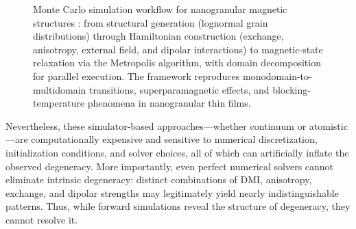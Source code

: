 \documentclass[letterpaper, 12, one column]{article}
\begin{document}
\begin{figure}[!t]
\centering
{}
    \caption{Monte Carlo simulation workflow for nanogranular magnetic structures \cite{AgudeloGiraldo2018}: from structural generation (lognormal grain distributions) through Hamiltonian construction (exchange, anisotropy, external field, and dipolar interactions) to magnetic-state relaxation via the Metropolis algorithm, with domain decomposition for parallel execution. The framework reproduces monodomain-to-multidomain transitions, superparamagnetic effects, and blocking-temperature phenomena in nanogranular thin films.}
    \label{fig:monte_carlo_flow}
\end{figure}

Nevertheless, these simulator-based approaches—whether continuum or atomistic—are computationally expensive and sensitive to numerical discretization, initialization conditions, and solver choices, all of which can artificially inflate the observed degeneracy. More importantly, even perfect numerical solvers cannot eliminate intrinsic degeneracy: distinct combinations of DMI, anisotropy, exchange, and dipolar strengths may legitimately yield nearly indistinguishable patterns. Thus, while forward simulations reveal the structure of degeneracy, they cannot resolve it.
\end{document}
